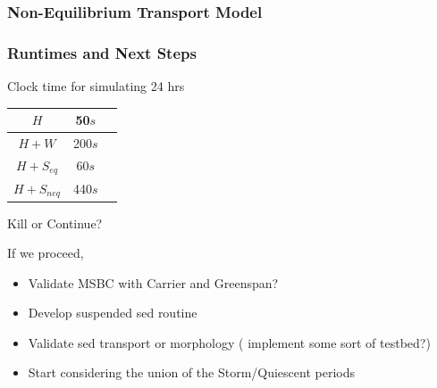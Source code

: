 \documentclass[aspectratio=169]{beamer}
\begin{document}
\begin{frame}
  \frametitle{Non-Equilibrium Transport Model} 
  \centering
\end{frame}
\begin{frame}
  \frametitle{Runtimes and Next Steps} 
Clock time for simulating 24 hrs 
\begin{center}
  \begin{tabular}{ |c|c|c| } 
    \hline
    $H$ & 50$s$ \\ 
    \hline
    $H+W$ & 200$s$ \\
    \hline
    $H+S_{eq}$ & 60$s$  \\
    \hline
    $H+S_{neq}$ & 440$s$  \\ 
    \hline
  \end{tabular}
\end{center}
Kill or Continue?

If we proceed, 
 \begin{itemize}
 \item Validate MSBC with Carrier and Greenspan?
 \item Develop suspended sed routine
 \item Validate sed transport or morphology ( implement some sort of testbed?)
 \item Start considering the union of the Storm/Quiescent periods
 \end{itemize}


\end{frame}
\end{document}
